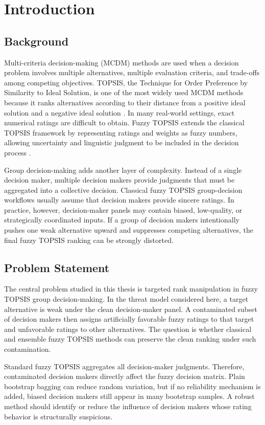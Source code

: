 \chapter{Introduction}

\section{Background}
Multi-criteria decision-making (MCDM) methods are used when a decision problem involves multiple alternatives, multiple evaluation criteria, and trade-offs among competing objectives. TOPSIS, the Technique for Order Preference by Similarity to Ideal Solution, is one of the most widely used MCDM methods because it ranks alternatives according to their distance from a positive ideal solution and a negative ideal solution \cite{hwang1981}. In many real-world settings, exact numerical ratings are difficult to obtain. Fuzzy TOPSIS extends the classical TOPSIS framework by representing ratings and weights as fuzzy numbers, allowing uncertainty and linguistic judgment to be included in the decision process \cite{chen2000}.

Group decision-making adds another layer of complexity. Instead of a single decision maker, multiple decision makers provide judgments that must be aggregated into a collective decision. Classical fuzzy TOPSIS group-decision workflows usually assume that decision makers provide sincere ratings. In practice, however, decision-maker panels may contain biased, low-quality, or strategically coordinated inputs. If a group of decision makers intentionally pushes one weak alternative upward and suppresses competing alternatives, the final fuzzy TOPSIS ranking can be strongly distorted.

\section{Problem Statement}
The central problem studied in this thesis is targeted rank manipulation in fuzzy TOPSIS group decision-making. In the threat model considered here, a target alternative is weak under the clean decision-maker panel. A contaminated subset of decision makers then assigns artificially favorable fuzzy ratings to that target and unfavorable ratings to other alternatives. The question is whether classical and ensemble fuzzy TOPSIS methods can preserve the clean ranking under such contamination.

Standard fuzzy TOPSIS aggregates all decision-maker judgments. Therefore, contaminated decision makers directly affect the fuzzy decision matrix. Plain bootstrap bagging can reduce random variation, but if no reliability mechanism is added, biased decision makers still appear in many bootstrap samples. A robust method should identify or reduce the influence of decision makers whose rating behavior is structurally suspicious.

